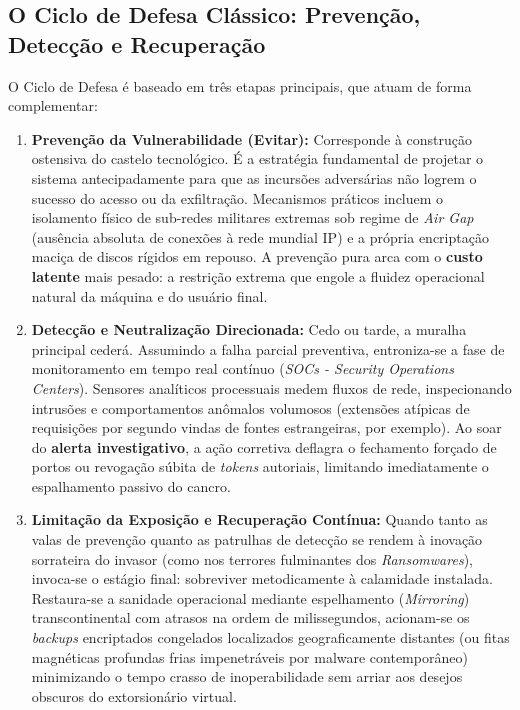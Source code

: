\documentclass[12pt,a4paper,twoside]{report}
\begin{document}
\subsection{O Ciclo de Defesa Clássico: Prevenção, Detecção e Recuperação}

O Ciclo de Defesa é baseado em três etapas principais, que atuam de forma complementar:

\begin{enumerate}
    \item \textbf{Prevenção da Vulnerabilidade (Evitar):} Corresponde à construção ostensiva do castelo tecnológico. É a estratégia fundamental de projetar o sistema antecipadamente para que as incursões adversárias não logrem o sucesso do acesso ou da exfiltração. Mecanismos práticos incluem o isolamento físico de sub-redes militares extremas sob regime de \textit{Air Gap} (ausência absoluta de conexões à rede mundial IP) e a própria encriptação maciça de discos rígidos em repouso. A prevenção pura arca com o \textbf{custo latente} mais pesado: a restrição extrema que engole a fluidez operacional natural da máquina e do usuário final.
    
    \item \textbf{Detecção e Neutralização Direcionada:} Cedo ou tarde, a muralha principal cederá. Assumindo a falha parcial preventiva, entroniza-se a fase de monitoramento em tempo real contínuo (\textit{SOCs - Security Operations Centers}). Sensores analíticos processuais medem fluxos de rede, inspecionando intrusões e comportamentos anômalos volumosos (extensões atípicas de requisições por segundo vindas de fontes estrangeiras, por exemplo). Ao soar do \textbf{alerta investigativo}, a ação corretiva deflagra o fechamento forçado de portos ou revogação súbita de \textit{tokens} autoriais, limitando imediatamente o espalhamento passivo do cancro.
    
    \item \textbf{Limitação da Exposição e Recuperação Contínua:} Quando tanto as valas de prevenção quanto as patrulhas de detecção se rendem à inovação sorrateira do invasor (como nos terrores fulminantes dos \textit{Ransomwares}), invoca-se o estágio final: sobreviver metodicamente à calamidade instalada. Restaura-se a sanidade operacional mediante espelhamento (\textit{Mirroring}) transcontinental com atrasos na ordem de milissegundos, acionam-se os \textit{backups} encriptados congelados localizados geograficamente distantes (ou fitas magnéticas profundas frias impenetráveis por malware contemporâneo) minimizando o tempo crasso de inoperabilidade sem arriar aos desejos obscuros do extorsionário virtual.
\end{enumerate}
\end{document}
